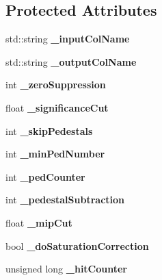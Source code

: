 \subsection*{Protected Attributes}
\begin{DoxyCompactItemize}
\item 
std\-::string {\bfseries \-\_\-input\-Col\-Name}\label{classCALICE_1_1IntegratedHcalCalibrationProcessor_ad9b166089f6501b37a89d13c0a25bb2e}

\item 
std\-::string {\bfseries \-\_\-output\-Col\-Name}\label{classCALICE_1_1IntegratedHcalCalibrationProcessor_a7b272632e6fd4e847dbb9dee88b7ceb8}

\item 
int {\bfseries \-\_\-zero\-Suppression}\label{classCALICE_1_1IntegratedHcalCalibrationProcessor_a50776188b69d33bec8a734fcc082b22b}

\item 
float {\bfseries \-\_\-significance\-Cut}\label{classCALICE_1_1IntegratedHcalCalibrationProcessor_a0f9dbdb9a4ebc2b7955679cc64e19636}

\item 
int {\bfseries \-\_\-skip\-Pedestals}\label{classCALICE_1_1IntegratedHcalCalibrationProcessor_a55d12f2aaaab3f29212109bfde96b759}

\item 
int {\bfseries \-\_\-min\-Ped\-Number}\label{classCALICE_1_1IntegratedHcalCalibrationProcessor_a2d709e61047bcb4cfbad62fde9d140df}

\item 
int {\bfseries \-\_\-ped\-Counter}\label{classCALICE_1_1IntegratedHcalCalibrationProcessor_ae916fee0673eb80e5acc3fdb73adc24a}

\item 
int {\bfseries \-\_\-pedestal\-Subtraction}\label{classCALICE_1_1IntegratedHcalCalibrationProcessor_a1c0d957bc70006c6f071d53799da2c5f}

\item 
float {\bfseries \-\_\-mip\-Cut}\label{classCALICE_1_1IntegratedHcalCalibrationProcessor_a5670d938f278f3d4d66fbf481f0ec4c4}

\item 
bool {\bfseries \-\_\-do\-Saturation\-Correction}\label{classCALICE_1_1IntegratedHcalCalibrationProcessor_aa022999f9178f6b1a8ea7575362fe8d1}

\item 
unsigned long {\bfseries \-\_\-hit\-Counter}\label{classCALICE_1_1IntegratedHcalCalibrationProcessor_a68d73faf87415a4af9a6e3a0f35476e8}


\end{DoxyCompactItemize}
